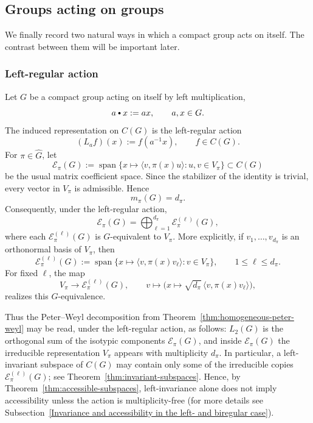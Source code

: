 \documentclass[11pt,showkeys]{amsart}
\newcommand{\hbullet}{\mathbin{\vcenter{\hbox{\scalebox{0.7}{$\bullet$}}}}}
\begin{document}
\subsection{Groups acting on groups}
\label{sec:Groups acting on groups}

We finally record two natural ways in which a compact group acts on
itself. The contrast between them will be important later.

\subsubsection{Left-regular action}

Let \(G\) be a compact group acting on itself by left multiplication,
\[
        a\hbullet x:=ax,
        \qquad a,x\in G.
\]
The induced representation on \(C(G)\) is the left-regular action
\[
        (L_a f)(x):=f(a^{-1}x),
        \qquad f\in C(G).
\]
For \(\pi\in\widehat G\), let
\[
        \mathcal E_\pi(G)
        :=
        \operatorname{span}
        \big\{x\mapsto \langle v,\pi(x)u\rangle:u,v\in V_\pi\big\}
        \subset C(G)
\]
be the usual matrix coefficient space. Since the stabilizer of the
identity is trivial, every vector in \(V_\pi\) is admissible. Hence
\[
        m_\pi(G)=d_\pi .
\]
Consequently, under the left-regular action,
\[
        \mathcal E_\pi(G)
        =
        \bigoplus_{\ell=1}^{d_\pi}
        \mathcal E_\pi^{(\ell)}(G),
\]
where each \(\mathcal E_\pi^{(\ell)}(G)\) is \(G\)-equivalent to
\(V_\pi\).
More explicitly, if \(v_1,\ldots,v_{d_\pi}\) is an orthonormal basis of
\(V_\pi\), then
\[
        \mathcal E_\pi^{(\ell)}(G)
        :=
        \operatorname{span}
        \big\{x\mapsto \langle v,\pi(x)v_\ell\rangle:v\in V_\pi\big\},
        \qquad
        1\leq \ell\leq d_\pi .
\]
For fixed \(\ell\), the map
\[
        V_\pi\longrightarrow \mathcal E_\pi^{(\ell)}(G),
        \qquad
        v\longmapsto
        \bigl(x\mapsto \sqrt{d_\pi}\,\langle v,\pi(x)v_\ell\rangle\bigr),
\]
realizes this $G$-equivalence.

Thus the Peter--Weyl decomposition from Theorem~\ref{thm:homogeneous-peter-weyl} may be read, under the
left-regular action, as follows: \(L_2(G)\) is the orthogonal sum of the
isotypic components \(\mathcal E_\pi(G)\), and inside
\(\mathcal E_\pi(G)\) the irreducible representation \(V_\pi\) appears
with multiplicity \(d_\pi\).
In particular, a left-invariant subspace of \(C(G)\) may contain only
some of the irreducible copies \(\mathcal E_\pi^{(\ell)}(G)\); see
Theorem~\ref{thm:invariant-subspaces}. Hence, by
Theorem~\ref{thm:accessible-subspaces}, left-invariance alone does not
imply accessibility unless the action is multiplicity-free (for more details see Subsection~\ref{Invariance and accessibility in the left- and biregular case}).
\end{document}
